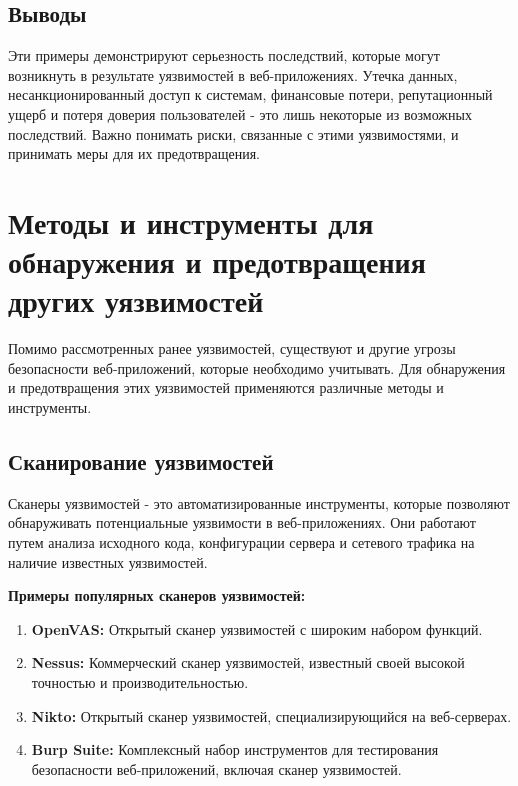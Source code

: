 \documentclass[a4paper,12pt]{diplom}
\begin{document}
	 \subsection{Выводы}
	 
	 Эти примеры демонстрируют серьезность последствий, которые могут возникнуть в результате уязвимостей в веб-приложениях. Утечка данных, несанкционированный доступ к системам, финансовые потери, репутационный ущерб и потеря доверия пользователей - это лишь некоторые из возможных последствий.  Важно понимать риски, связанные с этими уязвимостями, и принимать меры для их предотвращения. 
	 
	 
	 
	 
	 
	 
	 
	 
	 
	 
	 
	 
	 
	 
	 \section{Методы и инструменты для обнаружения и предотвращения других уязвимостей}
	 
	 Помимо рассмотренных ранее уязвимостей, существуют и другие угрозы безопасности веб-приложений, которые необходимо учитывать. Для обнаружения и предотвращения этих уязвимостей применяются различные методы и инструменты.
	 
	 \subsection{Сканирование уязвимостей}
	 
	 Сканеры уязвимостей - это автоматизированные инструменты, которые позволяют обнаруживать потенциальные уязвимости в веб-приложениях. Они работают путем анализа исходного кода, конфигурации сервера и сетевого трафика на наличие известных уязвимостей. 
	 
	 \textbf{Примеры популярных сканеров уязвимостей:}
	 
	 \begin{enumerate}[label=\arabic{enumi})]
	 	\item \textbf{OpenVAS:}  Открытый сканер уязвимостей с широким набором функций. 
	 	\item \textbf{Nessus:}  Коммерческий сканер уязвимостей, известный своей высокой точностью и производительностью.
	 	\item \textbf{Nikto:}  Открытый сканер уязвимостей, специализирующийся на веб-серверах. 
	 	\item \textbf{Burp Suite:}  Комплексный набор инструментов для тестирования безопасности веб-приложений, включая сканер уязвимостей.
	 \end{enumerate}
	 
\end{document}
